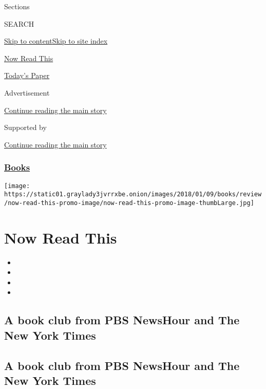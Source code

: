 Sections

SEARCH

\protect\hyperlink{site-content}{Skip to
content}\protect\hyperlink{site-index}{Skip to site index}

\href{https://www.nytimes3xbfgragh.onion/spotlight/now-read-this}{Now
Read This}

\href{https://myaccount.nytimes3xbfgragh.onion/auth/login?response_type=cookie\&client_id=vi}{}

\href{https://www.nytimes3xbfgragh.onion/section/todayspaper}{Today's
Paper}

Advertisement

\protect\hyperlink{after-top}{Continue reading the main story}

Supported by

\protect\hyperlink{after-sponsor}{Continue reading the main story}

\hypertarget{books}{%
\subsubsection{\texorpdfstring{\href{/section/books}{Books}}{Books}}\label{books}}

\texttt{[image: https://static01.graylady3jvrrxbe.onion/images/2018/01/09/books/review/now-read-this-promo-image/now-read-this-promo-image-thumbLarge.jpg]}

\hypertarget{now-read-this}{%
\section{Now Read This}\label{now-read-this}}

\begin{itemize}
\item
\item
\item
\item
\end{itemize}

\hypertarget{a-book-club-from-pbs-newshour-and-the-new-york-times}{%
\subsection{A book club from PBS NewsHour and The New York
Times}\label{a-book-club-from-pbs-newshour-and-the-new-york-times}}

\hypertarget{a-book-club-from-pbs-newshour-and-the-new-york-times-1}{%
\subsection{A book club from PBS NewsHour and The New York
Times}\label{a-book-club-from-pbs-newshour-and-the-new-york-times-1}}

